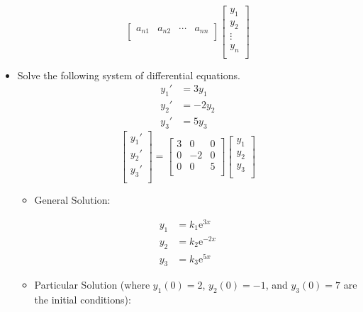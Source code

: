 \documentclass{article}
\newcommand{\e}{\text{e}}
\begin{document}
\begin{itemize}
\begin{equation*}
\begin{bmatrix}
            a_{n1} & a_{n2} & \cdots & a_{nn}\\
        \end{bmatrix}
        \begin{bmatrix}
            y_1\\
            y_2\\
            \vdots\\
            y_n\\
        \end{bmatrix}
    \end{equation*}
    \item Solve the following system of differential equations.
    \begin{align*}
        y_1' &= 3y_1\\
        y_2' &= -2y_2\\
        y_3' &= 5y_3
    \end{align*}
    \begin{equation*}
        \begin{bmatrix}
            y_1'\\
            y_2'\\
            y_3'\\
        \end{bmatrix}
        =
        \begin{bmatrix}
            3 & 0 & 0\\
            0 & -2 & 0\\
            0 & 0 & 5\\
        \end{bmatrix}
        \begin{bmatrix}
            y_1\\
            y_2\\
            y_3\\
        \end{bmatrix}
    \end{equation*}
    \begin{itemize}
        \item General Solution:
    \end{itemize}
    \begin{align*}
        y_1 &= k_1\e^{3x}\\
        y_2 &= k_2\e^{-2x}\\
        y_3 &= k_3\e^{5x}
    \end{align*}
    \begin{itemize}
        \item Particular Solution (where $y_1(0)=2$, $y_2(0)=-1$, and $y_3(0)=7$ are the initial conditions):

\end{itemize}
\end{itemize}
\end{document}
